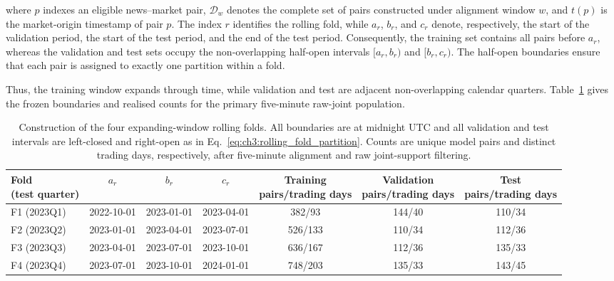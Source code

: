 where \(p\) indexes an eligible news--market pair, \(\mathcal D_w\) denotes the
complete set of pairs constructed under alignment window \(w\), and \(t(p)\)
is the market-origin timestamp of pair \(p\). The index \(r\) identifies the
rolling fold, while \(a_r\), \(b_r\), and \(c_r\) denote, respectively, the
start of the validation period, the start of the test period, and the end of
the test period. Consequently, the training set contains all pairs before
\(a_r\), whereas the validation and test sets occupy the non-overlapping
half-open intervals \([a_r,b_r)\) and \([b_r,c_r)\). The half-open boundaries
ensure that each pair is assigned to exactly one partition within a fold.


Thus, the training window expands through time, while validation and test are
adjacent non-overlapping calendar quarters.
Table~\ref{tab:ch3:rolling_fold_construction} gives the frozen boundaries and
realised counts for the primary five-minute raw-joint population.

\begin{table}[htbp]
\centering
\scriptsize
\setlength{\tabcolsep}{2pt}
\begin{tabular}{@{}lcccccc@{}}
\toprule
\shortstack{Fold\\(test quarter)}
& $a_r$
& $b_r$
& $c_r$
& \shortstack{Training\\pairs/trading days}
& \shortstack{Validation\\pairs/trading days}
& \shortstack{Test\\pairs/trading days} \\
\midrule
F1 (2023Q1) & 2022-10-01 & 2023-01-01 & 2023-04-01
             & 382/93 & 144/40 & 110/34 \\
F2 (2023Q2) & 2023-01-01 & 2023-04-01 & 2023-07-01
             & 526/133 & 110/34 & 112/36 \\
F3 (2023Q3) & 2023-04-01 & 2023-07-01 & 2023-10-01
             & 636/167 & 112/36 & 135/33 \\
F4 (2023Q4) & 2023-07-01 & 2023-10-01 & 2024-01-01
             & 748/203 & 135/33 & 143/45 \\
\bottomrule
\end{tabular}
\caption[Construction of four expanding-window rolling folds]{Construction of the four expanding-window rolling folds. All
boundaries are at midnight UTC and all validation and test intervals are
left-closed and right-open as in
Eq.~\eqref{eq:ch3:rolling_fold_partition}. Counts are unique model
pairs and distinct trading days, respectively, after five-minute alignment and
raw joint-support filtering.}
\label{tab:ch3:rolling_fold_construction}
\end{table}

